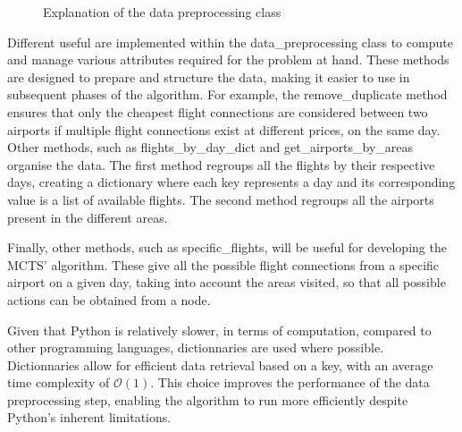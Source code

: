 \begin{figure}[!ht]
    \caption{Explanation of the data preprocessing class}
    \label{fig:data_preprocessing_class}
\end{figure}

Different useful  are implemented within the data\_preprocessing class to compute and manage various attributes required for the problem at hand. These methods are designed to prepare and structure the data, making it easier to use in subsequent phases of the algorithm.
For example, the remove\_duplicate method ensures that only the cheapest flight connections are considered between two airports if multiple flight connections exist at different prices, on the same day.
Other methods, such as flights\_by\_day\_dict and get\_airports\_by\_areas organise the data. The first method regroups all the flights by their respective days, creating a dictionary where each key represents a day and its corresponding value is a list of available flights. The second method regroups all the airports present in the different areas.

Finally, other methods, such as specific\_flights, will be useful for developing the MCTS' algorithm. These give all the possible flight connections from a specific airport on a given day, taking into account the areas visited, so that all possible actions can be obtained from a node.


Given that Python is relatively slower, in terms of computation, compared to other programming languages, dictionnaries are used where possible. Dictionnaries allow for efficient data retrieval based on a key, with an average time complexity of $\mathcal{O}(1)$. This choice improves the performance of the data preprocessing step, enabling the algorithm to run more efficiently despite Python’s inherent limitations.

\newpage
